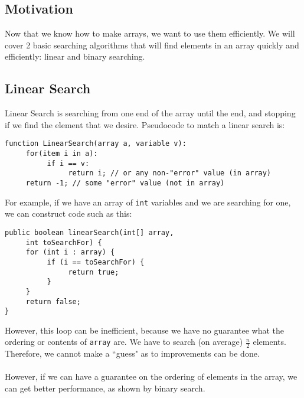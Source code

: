 
\subsection{Motivation}
Now that we know how to make arrays, we want to use them efficiently. We will cover 2 basic searching algorithms that will find elements in an array quickly and efficiently: linear and binary searching.

\subsection{Linear Search}
Linear Search is searching from one end of the array until the end, and stopping if we find the element that we desire. Pseudocode to match a linear search is:
\begin{verbatim}
function LinearSearch(array a, variable v):
     for(item i in a):
          if i == v:
               return i; // or any non-"error" value (in array)
     return -1; // some "error" value (not in array)
\end{verbatim}
For example, if we have an array of \verb|int| variables and we are searching for one, we can construct code such as this:
\begin{lstlisting}
public boolean linearSearch(int[] array, 
     int toSearchFor) {
     for (int i : array) {
          if (i == toSearchFor) {
               return true;
          }
     }
     return false;
}
\end{lstlisting}
However, this loop can be inefficient, because we have no guarantee what the ordering or contents of \verb|array| are. We have to search (on average) $\frac{n}{2}$ elements. Therefore, we cannot make a ``guess" as to improvements can be done.
\\ \\
However, if we can have a guarantee on the ordering of elements in the array, we can get better performance, as shown by binary search.

